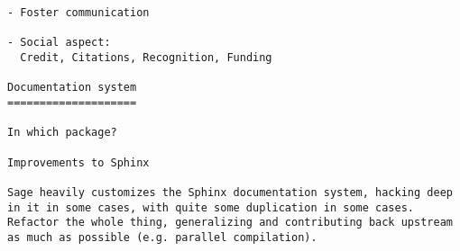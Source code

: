 \begin{Workpackage}{\thewpno}
\begin{verbatim}
- Foster communication

- Social aspect:
  Credit, Citations, Recognition, Funding

Documentation system
====================

In which package?

Improvements to Sphinx

Sage heavily customizes the Sphinx documentation system, hacking deep
in it in some cases, with quite some duplication in some cases.
Refactor the whole thing, generalizing and contributing back upstream
as much as possible (e.g. parallel compilation).
\end{verbatim}

\end{Workpackage}
